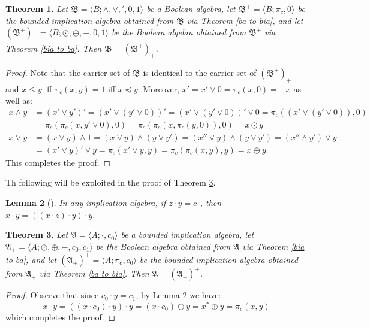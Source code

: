 \documentclass[reqno]{amsart}
\theoremstyle{plain}
\newtheorem{theorem}{Theorem}[section]
\newtheorem{lemma}[theorem]{Lemma}
\theoremstyle{definition}
\begin{document}
\begin{theorem}\label{theorem 2.10}
    Let $\mathfrak{B}=\langle B;\wedge,\vee,',0,1\rangle$ be a Boolean algebra, let $\mathfrak{B}^+=\langle B;\pi_c,0\rangle$ be the bounded implication algebra obtained from $\mathfrak{B}$ via Theorem \ref{ba to bia}, and let $(\mathfrak{B}^{+})_+=\langle B;\odot,\oplus,-,0,1\rangle$ be the Boolean algebra obtained from $\mathfrak{B}^+$ via Theorem \ref{bia to ba}. Then $\mathfrak{B}=(\mathfrak{B}^+)_+$. 
\end{theorem}
\begin{proof}
    Note that the carrier set of $\mathfrak{B}$ is identical to the carrier set of $(\mathfrak{B}^+)_+$ and $x\leq y$ iff $\pi_c(x,y)=1$ iff $x\preceq y$. Moreover, $x'=x'\vee0=\pi_c(x,0)=-x$ as well as:
    \begin{align*}
        x\wedge y&=(x'\vee y')'=(x'\vee(y'\vee 0))'=(x'\vee(y'\vee 0))'\vee 0=\pi_c((x'\vee(y'\vee0)),0)
        \\&=\pi_c(\pi_c(x,y'\vee 0),0)=\pi_c(\pi_c(x,\pi_c(y,0)),0)=x\odot y
    \end{align*}
    \begin{align*}
        x\vee y&=(x\vee y)\wedge 1=(x\vee y)\wedge(y\vee y')=(x''\vee y)\wedge(y\vee y')=(x''\wedge y')\vee y
        \\&=(x'\vee y)'\vee y=\pi_c(x'\vee y,y)=\pi_c(\pi_c(x,y),y)=x\oplus y.
    \end{align*}
    This completes the proof.
\end{proof} 
Th following will be exploited in the proof of Theorem \ref{theorem 2.12}. 
\begin{lemma}[\cite{abbott672}]\label{lemma 1}
    In any implication algebra, if $z\cdot y=c_1$, then $x\cdot y=((x\cdot z)\cdot y)\cdot y$.  
\end{lemma}
\begin{theorem}\label{theorem 2.12}
    Let $\mathfrak{A}=\langle A;\cdot,c_0\rangle$ be a bounded implication algebra, let $\mathfrak{A}_+=\langle A;\odot,\oplus,-,c_0,c_1\rangle$ be the Boolean algebra obtained from $\mathfrak{A}$ via Theorem \ref{bia to ba}, and let $(\mathfrak{A}_+)^+=\langle A;\pi_c,c_0\rangle$ be the bounded implication algebra obtained from $\mathfrak{A}_+$ via Theorem \ref{ba to bia}. Then $\mathfrak{A}=(\mathfrak{A}_+)^+$. 
\end{theorem}
\begin{proof}
    Observe that since $c_0\cdot y=c_1$, by Lemma \ref{lemma 1} we have: \[x\cdot y=((x\cdot c_0)\cdot y)\cdot y=(x\cdot c_0)\oplus y=x^*\oplus y=\pi_c(x,y)\] which completes the proof. 
\end{proof}
\end{document}
